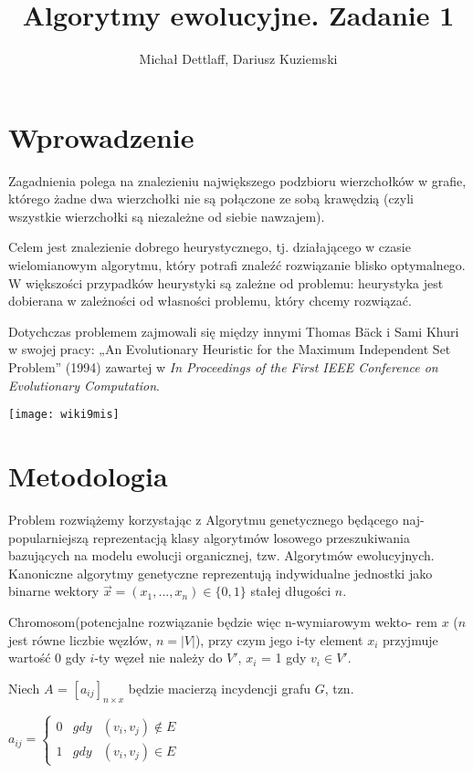 \documentclass[11pt]{article}
\begin{document}
\title{Algorytmy ewolucyjne. Zadanie 1}
\author{Michał Dettlaff, Dariusz Kuziemski}
\maketitle

\section{Wprowadzenie}

\noindent
Zagadnienia polega na znalezieniu największego podzbioru wierzchołków
w grafie, którego żadne dwa wierzchołki nie są połączone ze sobą krawędzią 
(czyli wszystkie wierzchołki są niezależne od siebie nawzajem).

Celem jest znalezienie dobrego heurystycznego, tj. działającego w czasie 
wielomianowym algorytmu, który potrafi znaleźć rozwiązanie blisko optymalnego. 
W większości przypadków  heurystyki są zależne od problemu: heurystyka jest 
dobierana w zależności od własności problemu, który chcemy rozwiązać.

Dotychczas problemem zajmowali się między innymi Thomas Bäck i Sami Khuri 
w swojej pracy: „An Evolutionary Heuristic for the Maximum Independent Set Problem” 
(1994) zawartej w \textit{In Proceedings of the First IEEE Conference on Evolutionary Computation}.\newline
\begin{center}
\texttt{[image: wiki9mis]}
\end{center}

\newpage
\section{Metodologia}

\noindent
Problem rozwiążemy korzystając z Algorytmu genetycznego będącego naj-
popularniejszą reprezentacją klasy algorytmów losowego przeszukiwania 
bazujących na modelu ewolucji organicznej, tzw.  Algorytmów ewolucyjnych. 
Kanoniczne algorytmy genetyczne reprezentują indywidualne jednostki 
jako binarne wektory $ \vec{x} = (x_1,...,x_n) \in \{0,1\} $ stałej długości $n$.

Chromosom(potencjalne rozwiązanie będzie więc n-wymiarowym wekto-
rem $x$ ($n$ jest równe liczbie węzłów, $n=|V|$), przy czym jego i-ty element $x_i$
przyjmuje wartość 0 gdy $ i $-ty węzeł nie należy do $ V' $, $ x_i $ = 1 gdy $ v_i \in  V' $.

Niech $A$ = $[a_{ij}]_{n \times x}$ będzie macierzą incydencji grafu $G$, tzn.
\begin{center}
$a_{ij} = 
\left\{\begin{array}{rcl}
0 & gdy & (v_i,v_j) \notin E\\
1 & gdy & (v_i,v_j) \in E
\end{array} \right.
$
\end{center}
\end{document}
